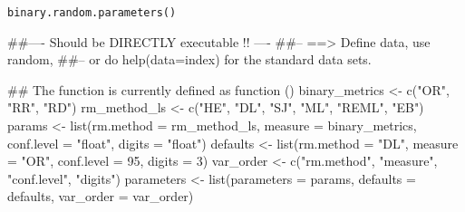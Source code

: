 \begin{Usage}
\begin{verbatim}
binary.random.parameters()
\end{verbatim}
\end{Usage}
\begin{Examples}
\begin{ExampleCode}
##---- Should be DIRECTLY executable !! ----
##-- ==>  Define data, use random,
##--    or do  help(data=index)  for the standard data sets.

## The function is currently defined as
function () 
{
    binary_metrics <- c("OR", "RR", "RD")
    rm_method_ls <- c("HE", "DL", "SJ", "ML", "REML", "EB")
    params <- list(rm.method = rm_method_ls, measure = binary_metrics, 
        conf.level = "float", digits = "float")
    defaults <- list(rm.method = "DL", measure = "OR", conf.level = 95, 
        digits = 3)
    var_order <- c("rm.method", "measure", "conf.level", "digits")
    parameters <- list(parameters = params, defaults = defaults, 
        var_order = var_order)
  }
\end{ExampleCode}
\end{Examples}

